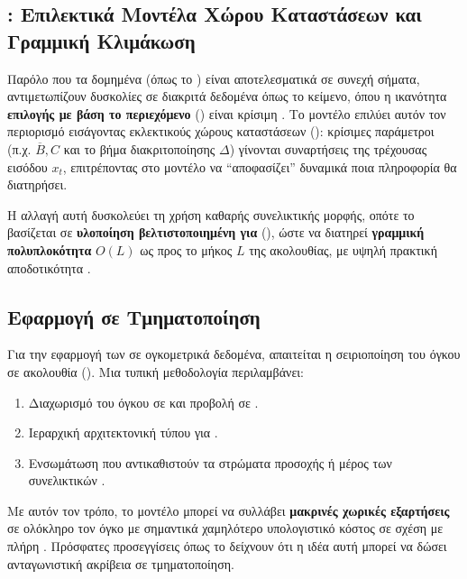 \subsection{: Επιλεκτικά Μοντέλα Χώρου Καταστάσεων και Γραμμική Κλιμάκωση}

Παρόλο που τα δομημένα  (όπως το ) είναι αποτελεσματικά σε συνεχή σήματα,
αντι\-μετωπίζουν δυσκολίες σε διακριτά δεδομένα όπως το κείμενο, 
όπου η ικανότητα \textbf{επιλο\-γής με βάση το περιεχόμενο} () είναι κρίσιμη \cite{gu2023mamba}. 
Το μοντέλο  επιλύει αυτόν τον περιορισμό εισάγοντας εκλεκτικούς χώρους καταστάσεων (): 
κρίσιμες παράμετροι (π.χ. $\overline{B}, C$ και το βήμα διακριτοποίησης $\Delta$) γίνονται συναρτήσεις της τρέχουσας εισόδου $x_t$, επιτρέποντας στο μοντέλο να ``αποφασίζει'' δυναμικά ποια πληροφορία θα διατηρήσει.

Η αλλαγή αυτή δυσκολεύει τη χρήση καθαρής συνελικτικής μορφής, οπότε το  βασίζεται σε \textbf{υλοποίηση βελτιστοποιημένη για } (), 
ώστε να διατηρεί \textbf{γραμμική πολυπλοκότητα} $Ο(L)$ ως προς το μήκος $L$ της ακολουθίας, με υψηλή πρακτική αποδοτικότητα \cite{gu2023mamba}.

\subsection{Εφαρμογή  σε  Τμηματοποίηση}
Για την εφαρμογή των  σε ογκομετρικά δεδομένα, απαιτείται η 
σειριοποίηση του όγκου σε ακολουθία (). Μια τυπική 
μεθοδολογία περιλαμβάνει:
\begin{enumerate}
  \item Διαχωρισμό του  όγκου σε  και 
  προβολή σε .
  \item Ιεραρχική αρχιτεκτονική τύπου  για .
  \item Ενσωμάτωση  που αντικαθιστούν τα στρώματα προσοχής ή μέρος των συνελικτικών .
\end{enumerate}
Με αυτόν τον τρόπο, το μοντέλο μπορεί να συλλάβει \textbf{μακρινές χωρικές 
εξαρτήσεις} σε ολό\-κληρο τον όγκο με σημαντικά χαμηλότερο υπολογιστικό κόστος σε σχέση με πλήρη
. Πρόσφατες προσεγγίσεις όπως το  \cite{xing2024segmamba} δείχνουν 
ότι η ιδέα αυτή μπορεί να δώσει ανταγωνιστική ακρίβεια σε  τμηματοποίηση.

